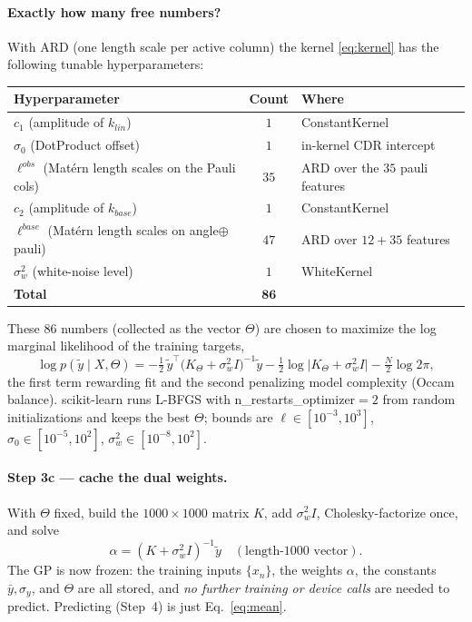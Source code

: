 \documentclass[11pt]{article}
\def\bm#1{#1}%
\def\texttt#1{#1}%
\def\mathrm#1{#1}%
\begin{document}
\paragraph{Exactly how many free numbers?} With ARD (one length scale per active
column) the kernel \eqref{eq:kernel} has the following tunable hyperparameters:
\begin{center}
\renewcommand{\arraystretch}{1.2}
\begin{tabular}{@{}lcl@{}}
\toprule
Hyperparameter & Count & Where \\
\midrule
$c_1$ (amplitude of $k_{\mathrm{lin}}$) & $1$ & ConstantKernel \\
$\sigma_0$ (DotProduct offset) & $1$ & in-kernel CDR intercept \\
$\bm\ell^{\mathrm{obs}}$ (Mat\'ern length scales on the Pauli cols) & $35$ & ARD over the $35$ pauli features \\
$c_2$ (amplitude of $k_{\mathrm{base}}$) & $1$ & ConstantKernel \\
$\bm\ell^{\mathrm{base}}$ (Mat\'ern length scales on angle$\oplus$pauli) & $47$ & ARD over $12+35$ features \\
$\sigma_w^2$ (white-noise level) & $1$ & WhiteKernel \\
\midrule
\textbf{Total} & $\mathbf{86}$ & \\
\bottomrule
\end{tabular}
\end{center}
These $86$ numbers (collected as the vector $\bm\Theta$) are chosen to maximize
the log marginal likelihood of the training targets,
\begin{equation}
\log p(\tilde{\bm y}\mid X,\bm\Theta)=
-\tfrac12\,\tilde{\bm y}^{\!\top}\big(K_{\bm\Theta}+\sigma_w^2 I\big)^{-1}\tilde{\bm y}
-\tfrac12\log\big|K_{\bm\Theta}+\sigma_w^2 I\big|
-\tfrac{N}{2}\log 2\pi,
\label{eq:lml}
\end{equation}
the first term rewarding fit and the second penalizing model complexity
(Occam balance). scikit-learn runs L-BFGS with
\texttt{n\_restarts\_optimizer}$=2$ from random initializations and keeps the best
$\bm\Theta$; bounds are $\ell\in[10^{-3},10^{3}]$,
$\sigma_0\in[10^{-5},10^{2}]$, $\sigma_w^2\in[10^{-8},10^{2}]$.

\paragraph{Step 3c --- cache the dual weights.} With $\bm\Theta$ fixed, build the
$1000\times1000$ matrix $K$, add $\sigma_w^2 I$, Cholesky-factorize once, and solve
\begin{equation}
\bm\alpha=(K+\sigma_w^2 I)^{-1}\tilde{\bm y}\quad(\text{length-}1000\text{ vector}).
\end{equation}
The GP is now frozen: the training inputs $\{\bm x_n\}$, the weights $\bm\alpha$,
the constants $\bar y,\sigma_y$, and $\bm\Theta$ are all stored, and \emph{no
further training or device calls} are needed to predict. Predicting (Step~4) is
just Eq.~\eqref{eq:mean}.
\end{document}
